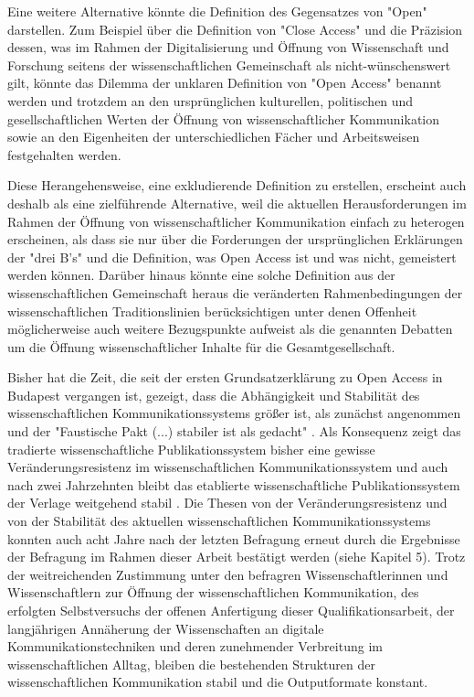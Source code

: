 Eine weitere Alternative könnte die Definition des Gegensatzes von "Open" darstellen. Zum Beispiel über die Definition von "Close Access" und die Präzision dessen, was im Rahmen der Digitalisierung und Öffnung von Wissenschaft und Forschung seitens der wissenschaftlichen Gemeinschaft als nicht-wünschenswert gilt, könnte das Dilemma der unklaren Definition von "Open Access" benannt werden und trotzdem an den ursprünglichen kulturellen, politischen und gesellschaftlichen Werten der Öffnung von wissenschaftlicher Kommunikation sowie an den Eigenheiten der unterschiedlichen Fächer und Arbeitsweisen festgehalten werden.

Diese Herangehensweise, eine exkludierende Definition zu erstellen, erscheint auch deshalb als eine zielführende Alternative, weil die aktuellen Herausforderungen im Rahmen der Öffnung von wissenschaftlicher Kommunikation einfach zu heterogen erscheinen, als dass sie nur über die Forderungen der ursprünglichen Erklärungen der "drei B's" und die Definition, was Open Access ist und was nicht, gemeistert werden können. Darüber hinaus könnte eine solche Definition aus der wissenschaftlichen Gemeinschaft heraus die veränderten Rahmenbedingungen der wissenschaftlichen Traditionslinien berücksichtigen unter denen Offenheit möglicherweise auch weitere Bezugspunkte aufweist als die genannten Debatten um die Öffnung wissenschaftlicher Inhalte für die Gesamtgesellschaft.

Bisher hat die Zeit, die seit der ersten Grundsatzerklärung zu Open Access in Budapest vergangen ist, gezeigt, dass die Abhängigkeit und Stabilität des wissenschaftlichen Kommunikationssystems größer ist, als zunächst angenommen und der "Faustische Pakt (...) stabiler ist als gedacht" \cite[:75]{Hagner_2015}. Als Konsequenz zeigt das tradierte wissenschaftliche Publikationssystem bisher eine gewisse Veränderungsresistenz im wissenschaftlichen Kommunikationssystem und auch nach zwei Jahrzehnten bleibt das etablierte wissenschaftliche Publikationssystem der Verlage weitgehend stabil \cite{Hanekop_2014}. Die Thesen von der Veränderungsresistenz und von der Stabilität des aktuellen wissenschaftlichen Kommunikationssystems konnten auch acht Jahre nach der letzten Befragung \cite{Hanekop_2007} erneut durch die Ergebnisse der Befragung im Rahmen dieser Arbeit bestätigt werden (siehe Kapitel 5). Trotz der weitreichenden Zustimmung unter den befragren Wissenschaftlerinnen und Wissenschaftlern zur Öffnung der wissenschaftlichen Kommunikation, des erfolgten Selbstversuchs der offenen Anfertigung dieser Qualifikationsarbeit, der langjährigen Annäherung der Wissenschaften an digitale Kommunikationstechniken und deren zunehmender Verbreitung im wissenschaftlichen Alltag, bleiben die bestehenden Strukturen der wissenschaftlichen Kommunikation stabil und die Outputformate konstant.

